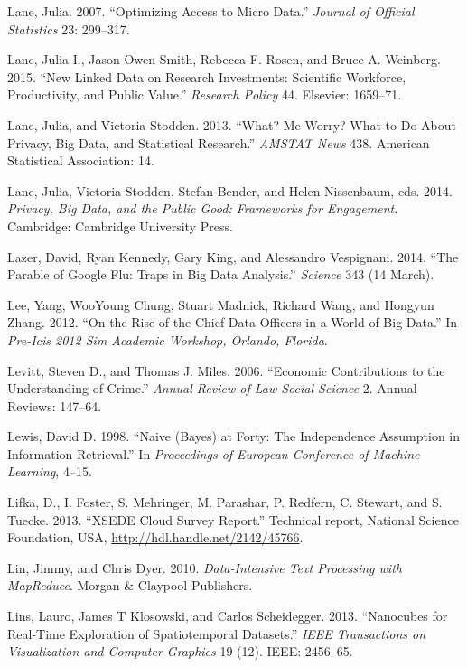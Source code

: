 \documentclass[]{krantz}
\begin{document}
\hypertarget{ref-Lane2007}{}
Lane, Julia. 2007. ``Optimizing Access to Micro Data.'' \emph{Journal of
Official Statistics} 23: 299--317.

\hypertarget{ref-lane2015new}{}
Lane, Julia I., Jason Owen-Smith, Rebecca F. Rosen, and Bruce A.
Weinberg. 2015. ``New Linked Data on Research Investments: Scientific
Workforce, Productivity, and Public Value.'' \emph{Research Policy} 44.
Elsevier: 1659--71.

\hypertarget{ref-lane2013me}{}
Lane, Julia, and Victoria Stodden. 2013. ``What? Me Worry? What to Do
About Privacy, Big Data, and Statistical Research.'' \emph{AMSTAT News}
438. American Statistical Association: 14.

\hypertarget{ref-lane2014}{}
Lane, Julia, Victoria Stodden, Stefan Bender, and Helen Nissenbaum, eds.
2014. \emph{Privacy, Big Data, and the Public Good: Frameworks for
Engagement}. Cambridge: Cambridge University Press.

\hypertarget{ref-lazer2014parable}{}
Lazer, David, Ryan Kennedy, Gary King, and Alessandro Vespignani. 2014.
``The Parable of Google Flu: Traps in Big Data Analysis.''
\emph{Science} 343 (14 March).

\hypertarget{ref-lee2012rise}{}
Lee, Yang, WooYoung Chung, Stuart Madnick, Richard Wang, and Hongyun
Zhang. 2012. ``On the Rise of the Chief Data Officers in a World of Big
Data.'' In \emph{Pre-Icis 2012 Sim Academic Workshop, Orlando, Florida}.

\hypertarget{ref-levitt2006economic}{}
Levitt, Steven D., and Thomas J. Miles. 2006. ``Economic Contributions
to the Understanding of Crime.'' \emph{Annual Review of Law Social
Science} 2. Annual Reviews: 147--64.

\hypertarget{ref-lewis-05}{}
Lewis, David D. 1998. ``Naive (Bayes) at Forty: The Independence
Assumption in Information Retrieval.'' In \emph{Proceedings of European
Conference of Machine Learning}, 4--15.

\hypertarget{ref-Lifka}{}
Lifka, D., I. Foster, S. Mehringer, M. Parashar, P. Redfern, C. Stewart,
and S. Tuecke. 2013. ``XSEDE Cloud Survey Report.'' Technical report,
National Science Foundation, USA,
\url{http://hdl.handle.net/2142/45766}.

\hypertarget{ref-lin2010data}{}
Lin, Jimmy, and Chris Dyer. 2010. \emph{Data-Intensive Text Processing
with MapReduce}. Morgan \& Claypool Publishers.

\hypertarget{ref-lins2013nanocubes}{}
Lins, Lauro, James T Klosowski, and Carlos Scheidegger. 2013.
``Nanocubes for Real-Time Exploration of Spatiotemporal Datasets.''
\emph{IEEE Transactions on Visualization and Computer Graphics} 19 (12).
IEEE: 2456--65.
\end{document}
